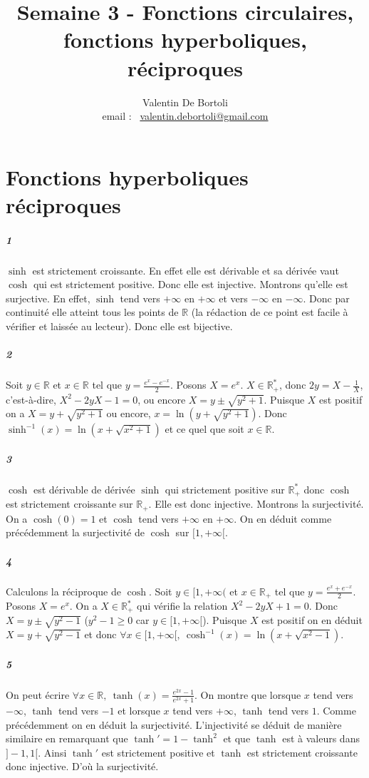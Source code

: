 \documentclass[10pt,a4paper]{article}
\title{Semaine 3 - Fonctions circulaires, fonctions hyperboliques, réciproques}
\author{Valentin De Bortoli \\ email : \ \href{mailto:valentin.debortoli@gmail.com}{valentin.debortoli@gmail.com}}
\date{}
\begin{document}
\maketitle

\section{Fonctions hyperboliques réciproques}
\subparagraph{1}$\sinh$ est strictement croissante. En effet elle est dérivable et sa dérivée vaut $\cosh$ qui est strictement positive. Donc elle est injective. Montrons qu'elle est surjective. En effet, $\sinh$ tend vers $+\infty$ en $+\infty$ et vers $-\infty$ en $-\infty$. Donc par continuité elle atteint tous les points de $\mathbb{R}$ (la rédaction de ce point est facile à vérifier et laissée au lecteur). Donc elle est bijective.

\subparagraph{2}Soit $y \in \mathbb{R}$ et $x \in \mathbb{R}$ tel que $y = \frac{e^x - e^{-x}}{2}$. Posons $X = e^x$. $X \in \mathbb{R}_+^*$, donc $2y = X - \frac{1}{X}$, c'est-à-dire, $X^2-2yX-1 = 0$, ou encore $X = y \pm \sqrt{y^2 + 1}$. Puisque $X$ est positif on a $X = y + \sqrt{y^2 +1}$ ou encore, ${x = \ln \left( y+ \sqrt{y^2+1}\right)}$. Donc $\sinh^{-1}(x) = \ln \left( x + \sqrt{x^2 +1}\right)$ et ce quel que soit $x \in \mathbb{R}$.

\subparagraph{3}$\cosh$ est dérivable de dérivée $\sinh$ qui strictement positive sur $\mathbb{R}_+^*$ donc $\cosh$ est strictement croissante sur $\mathbb{R}_+$. Elle est donc injective. Montrons la surjectivité. On a $\cosh(0) = 1$ et $\cosh$ tend vers $+\infty$ en $+\infty$. On en déduit comme précédemment la surjectivité de $\cosh$ sur $[1,+\infty[$.

\subparagraph{4}Calculons la réciproque de $\cosh$. Soit $y \in [1,+\infty($ et $x \in \mathbb{R}_+$ tel que $y = \frac{e^x+e^{-x}}{2}$. Posons $X = e^x$. On a $X \in \mathbb{R}_+^*$ qui vérifie la relation $X^2 -2yX +1 = 0$. Donc $X = y \pm \sqrt{y^2 - 1}$ ($y^2-1 \ge 0$ car $y \in [1,+\infty[$). Puisque $X$ est positif on en déduit $X = y +\sqrt{y^2-1}$ et donc $\forall x \in [1,+\infty[, \ \cosh^{-1}(x) = \ln \left( x + \sqrt{x^2 - 1}\right)$.

\subparagraph{5} On peut écrire $\forall x \in \mathbb{R}, \ \tanh(x) = \frac{e^{2x}-1}{e^{2x}+1}$. On montre que lorsque $x$ tend vers $-\infty$, $\tanh$ tend vers $-1$ et lorsque $x$ tend vers $+\infty$, $\tanh$ tend vers $1$. Comme précédemment on en déduit la surjectivité. L'injectivité se déduit de manière similaire en remarquant que $\tanh' = 1- \tanh^2$ et que $\tanh$ est à valeurs dans $]-1,1[$. Ainsi $\tanh'$ est strictement positive et $\tanh$ est strictement croissante donc injective. D'où la surjectivité.
\end{document}
